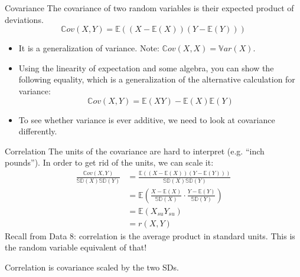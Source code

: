 \documentclass[aspectratio=169]{../latex_main/tntbeamer}  %
\begin{document}
	\begin{frame}[c]{Covariance}
	   The covariance of two random variables is their expected product of deviations.
	   \begin{equation*}
	       \mathbb{C}ov(X,Y) = \mathbb{E}((X-\mathbb{E}(X))(Y-\mathbb{E}(Y)))
	   \end{equation*}
	   \begin{itemize}
	       \item It is a generalization of variance. Note:   $\mathbb{C}ov(X,X) = \mathbb{V}ar(X)$.   
	       \item Using the linearity of expectation and some algebra, you can show the following equality, which is a generalization of the alternative calculation for variance:
	       \begin{equation*}
	           \mathbb{C}ov(X,Y) = \mathbb{E}(XY) - \mathbb{E}(X)\mathbb{E}(Y)
	       \end{equation*}
	       \item To see whether variance is ever additive, we need to look at covariance differently.
	   \end{itemize}
	\end{frame}
	
	\begin{frame}[c]{Correlation}
	   The units of the covariance are hard to interpret (e.g. “inch pounds”). In order to get rid of the units, we can scale it:
	   \begin{align*}
	       \frac{\mathbb{C}ov(X,Y)}{\mathbb{SD}(X)\mathbb{SD}(Y)}  &= \frac{ \mathbb{E}((X-\mathbb{E}(X))(Y-\mathbb{E}(Y)))}{\mathbb{SD}(X)\mathbb{SD}(Y)}\\
	       &= \mathbb{E}\left( \frac{X-\mathbb{E}(X)}{\mathbb{SD}(X)} \cdot \frac{Y-\mathbb{E}(Y)}{\mathbb{SD}(Y)}\right)\\
	       &= \mathbb{E}(X_{su}Y_{su})\\
	       &= r(X,Y)
	   \end{align*}
	   Recall from Data 8: correlation is the average product in standard units. This is the random variable equivalent of that!

	   Correlation is covariance scaled by the two SDs.
	\end{frame}
\end{document}
